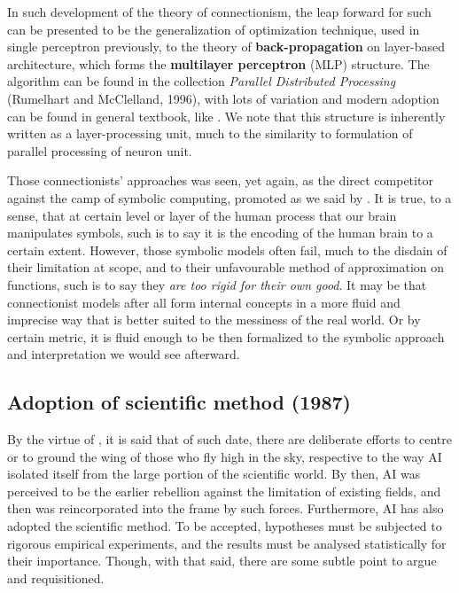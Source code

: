 In such development of the theory of connectionism, the leap forward for such can be presented to be the generalization of optimization technique, used in single perceptron previously, to the theory of \textbf{back-propagation} on layer-based architecture, which forms the \textbf{multilayer perceptron} (MLP) structure. The algorithm can be found in the collection \textit{Parallel Distributed Processing} (Rumelhart and McClelland, 1996), with lots of variation and modern adoption can be found in general textbook, like \cite{marcus2018deep,goodfellow2016deep}. We note that this structure is inherently written as a layer-processing unit, much to the similarity to \cite{Rosenblatt1958ThePA} formulation of parallel processing of neuron unit. 

Those connectionists' approaches was seen, yet again, as the direct competitor against the camp of symbolic computing, promoted as we said by \cite{1056797NewellSimon}. It is true, to a sense, that at certain level or layer of the human process that our brain manipulates symbols, such is to say it is the encoding of the human brain to a certain extent. However, those symbolic models often fail, much to the disdain of their limitation at scope, and to their unfavourable method of approximation on functions, such is to say they \textit{are too rigid for their own good}. It may be that connectionist models after all form internal concepts in a more fluid and imprecise way that is better suited to the messiness of the real world. Or by certain metric, it is fluid enough to be then formalized to the symbolic approach and interpretation we would see afterward. 

\subsection{Adoption of scientific method (1987)}

By the virtue of \cite{10.5555/1671238}, it is said that of such date, there are deliberate efforts to centre or to ground the wing of those who fly high in the sky, respective to the way AI isolated itself from the large portion of the scientific world. By then, AI was perceived to be the earlier rebellion against the limitation of existing fields, and then was reincorporated into the frame by such forces. Furthermore, AI has also adopted the scientific method. To be accepted, hypotheses must be subjected to rigorous empirical experiments, and the results must be analysed statistically for their importance. Though, with that said, there are some subtle point to argue and requisitioned. 


